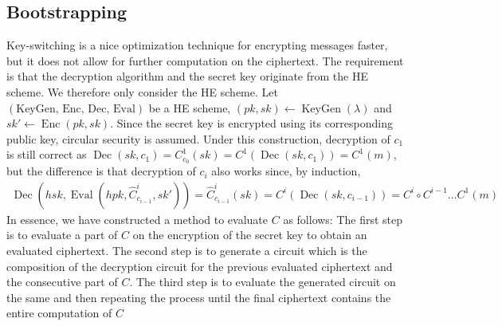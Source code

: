 \subsection*{Bootstrapping}
Key-switching is a nice optimization technique for encrypting messages faster, but it does not allow for further computation on the ciphertext. The requirement is that the decryption algorithm and the secret key originate from the HE scheme. We therefore only consider the HE scheme. Let $(\text{KeyGen, Enc, Dec, Eval})$ be a HE scheme, $(pk, sk) \leftarrow \operatorname{KeyGen}(\lambda)$ and $sk' \leftarrow \operatorname{Enc}(pk, sk)$. Since the secret key is encrypted using its corresponding public key, circular security is assumed. Under this construction, decryption of $c_1$ is still correct as $\operatorname{Dec}(sk, c_1) = C^1_{c_0}(sk) = C^1(\operatorname{Dec}(sk,c_1)) = C^1(m)$, but the difference is that decryption of $c_i$ also works since, by induction,
\begin{equation*}
    \begin{aligned}
        \operatorname{Dec}(hsk,\operatorname{Eval}(hpk,\hat{C}^i_{c_{i-1}}, sk')) = \hat{C}^i_{c_{i-1}}(sk) = C^i(\operatorname{Dec}(sk, c_{i-1})) = C^i \circ C^{i-1} \dots C^1(m)
    \end{aligned}
\end{equation*}
In essence, we have constructed a method to evaluate $C$ as follows: The first step is to evaluate a part of $C$ on the encryption of the secret key to obtain an evaluated ciphertext. The second step is to generate a circuit which is the composition of the decryption circuit for the previous evaluated ciphertext and the consecutive part of $C$. The third step is to evaluate the generated circuit on the same  and then repeating the process until the final ciphertext contains the entire computation of $C$







